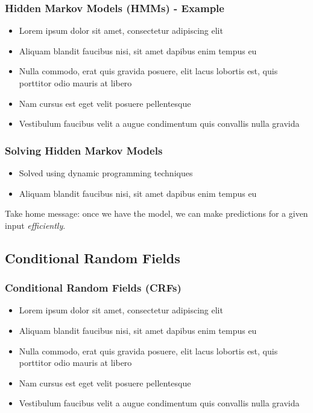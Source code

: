 \documentclass{beamer}
\begin{document}

\begin{frame}
\frametitle{Hidden Markov Models (HMMs) - Example}
\begin{itemize}
\item Lorem ipsum dolor sit amet, consectetur adipiscing elit
\item Aliquam blandit faucibus nisi, sit amet dapibus enim tempus eu
\item Nulla commodo, erat quis gravida posuere, elit lacus lobortis est, quis porttitor odio mauris at libero
\item Nam cursus est eget velit posuere pellentesque
\item Vestibulum faucibus velit a augue condimentum quis convallis nulla gravida
\end{itemize}
\end{frame}


\begin{frame}
\frametitle{Solving Hidden Markov Models}
\begin{itemize}
\item Solved using dynamic programming techniques
\item Aliquam blandit faucibus nisi, sit amet dapibus enim tempus eu
\end{itemize}

Take home message: once we have the model, we can make predictions for a given input \emph{efficiently}.

\end{frame}


\subsection{Conditional Random Fields}
\begin{frame}
\frametitle{Conditional Random Fields (CRFs)}
\begin{itemize}
\item Lorem ipsum dolor sit amet, consectetur adipiscing elit
\item Aliquam blandit faucibus nisi, sit amet dapibus enim tempus eu
\item Nulla commodo, erat quis gravida posuere, elit lacus lobortis est, quis porttitor odio mauris at libero
\item Nam cursus est eget velit posuere pellentesque
\item Vestibulum faucibus velit a augue condimentum quis convallis nulla gravida
\end{itemize}
\end{frame}
\end{document}
